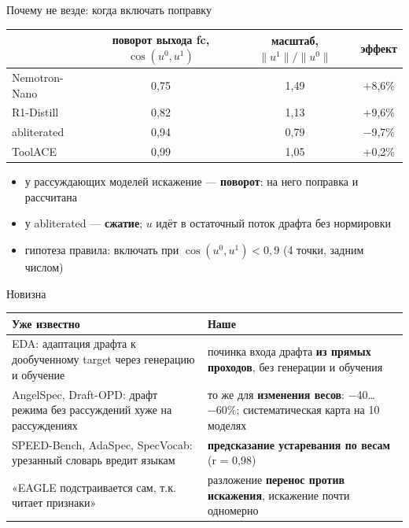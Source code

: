 \documentclass[aspectratio=169,11pt]{beamer}
\newcommand{\pos}[1]{\textcolor{good}{#1}}
\newcommand{\negv}[1]{\textcolor{bad}{#1}}
\begin{document}
\begin{frame}{Почему не везде: когда включать поправку}
\begin{center}
\begin{tabular}{@{}lccc@{}}
\toprule
 & поворот выхода fc, $\cos(u^0,u^1)$ & масштаб, $\|u^1\|/\|u^0\|$ & эффект \\
\midrule
Nemotron-Nano & 0,75 & 1,49 & \pos{+8,6\%} \\
R1-Distill & 0,82 & 1,13 & \pos{+9,6\%} \\
abliterated & 0,94 & 0,79 & \negv{−9,7\%} \\
ToolACE & 0,99 & 1,05 & +0,2\% \\
\bottomrule
\end{tabular}
\end{center}
\begin{itemize}
\item у рассуждающих моделей искажение --- \textbf{поворот}: на него поправка и рассчитана
\item у abliterated --- \textbf{сжатие}; $u$ идёт в остаточный поток драфта без нормировки
\item гипотеза правила: включать при $\cos(u^0,u^1)<0{,}9$ (4 точки, задним числом)
\end{itemize}
\end{frame}

\begin{frame}{Новизна}
\small
\begin{tabular}{@{}p{}p{}@{}}
\toprule
Уже известно & Наше \\
\midrule
EDA: адаптация драфта к дообученному target через генерацию и обучение &
починка входа драфта \textbf{из прямых проходов}, без генерации и обучения \\
AngelSpec, Draft-OPD: драфт режима без рассуждений хуже на рассуждениях &
то же для \textbf{изменения весов}: −40…−60\%; систематическая карта на 10 моделях \\
SPEED-Bench, AdaSpec, SpecVocab: урезанный словарь вредит языкам &
\textbf{предсказание устаревания по весам} (r = 0,98) \\
«EAGLE подстраивается сам, т.к. читает признаки» &
разложение \textbf{перенос против искажения}, искажение почти одномерно \\
\bottomrule
\end{tabular}
\end{frame}
\end{document}
